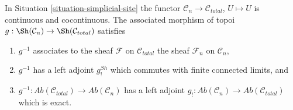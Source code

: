 \begin{lemma}
\label{lemma-restriction-to-components-site}
In Situation \ref{situation-simplicial-site} the functor
$\mathcal{C}_n \to \mathcal{C}_{total}$, $U \mapsto U$ is continuous
and cocontinuous. The associated morphism of
topoi $g : \Sh(\mathcal{C}_n) \to \Sh(\mathcal{C}_{total})$ satisfies
\begin{enumerate}
\item $g^{-1}$ associates to the sheaf $\mathcal{F}$ on $\mathcal{C}_{total}$
the sheaf $\mathcal{F}_n$ on $\mathcal{C}_n$,
\item $g^{-1}$ has a left adjoint $g^{Sh}_!$ which commutes
with finite connected limits, and
\item $g^{-1} : \textit{Ab}(\mathcal{C}_{total}) \to \textit{Ab}(\mathcal{C}_n)$
has a left adjoint
$g_! : \textit{Ab}(\mathcal{C}_n) \to \textit{Ab}(\mathcal{C}_{total})$
which is exact.
\end{enumerate}
\end{lemma}

